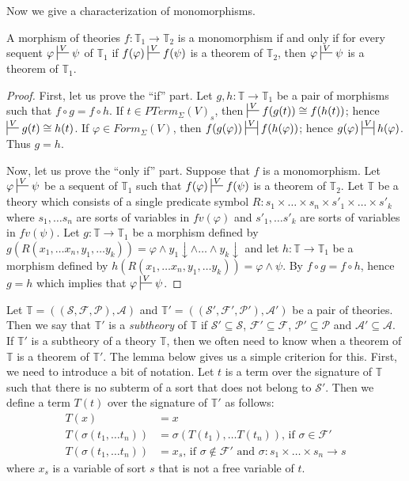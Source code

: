 \documentclass{amsart}
\theoremstyle{definition}
\theoremstyle{remark}
\numberwithin{figure}{section}
\begin{document}
Now we give a characterization of monomorphisms.

\begin{prop}
A morphism of theories $f : \mathbb{T}_1 \to \mathbb{T}_2$ is a monomorphism if and only if for every sequent $\varphi \sststile{}{V} \psi$ of $\mathbb{T}_1$
if $f(\varphi) \sststile{}{V} f(\psi)$ is a theorem of $\mathbb{T}_2$, then $\varphi \sststile{}{V} \psi$ is a theorem of $\mathbb{T}_1$.
\end{prop}
\begin{proof}
First, let us prove the ``if'' part.
Let $g,h : \mathbb{T} \to \mathbb{T}_1$ be a pair of morphisms such that $f \circ g = f \circ h$.
If $t \in PTerm_\Sigma(V)_s$, then $\sststile{}{V} f(g(t)) \cong f(h(t))$; hence $\sststile{}{V} g(t) \cong h(t)$.
If $\varphi \in Form_\Sigma(V)$, then $f(g(\varphi)) \ssststile{}{V} f(h(\varphi))$; hence $g(\varphi) \ssststile{}{V} h(\varphi)$.
Thus $g = h$.

Now, let us prove the ``only if'' part.
Suppose that $f$ is a monomorphism.
Let $\varphi \sststile{}{V} \psi$ be a sequent of $\mathbb{T}_1$ such that $f(\varphi) \sststile{}{V} f(\psi)$ is a theorem of $\mathbb{T}_2$.
Let $\mathbb{T}$ be a theory which consists of a single predicate symbol $R : s_1 \times \ldots \times s_n \times s'_1 \times \ldots \times s'_k$
where $s_1, \ldots s_n$ are sorts of variables in $fv(\varphi)$ and $s'_1, \ldots s'_k$ are sorts of variables in $fv(\psi)$.
Let $g : \mathbb{T} \to \mathbb{T}_1$ be a morphism defined by $g(R(x_1, \ldots x_n, y_1, \ldots y_k)) = \varphi \land y_1\!\downarrow \land \ldots \land y_k\!\downarrow$ and
let $h : \mathbb{T} \to \mathbb{T}_1$ be a morphism defined by $h(R(x_1, \ldots x_n, y_1, \ldots y_k)) = \varphi \land \psi$.
By  $f \circ g = f \circ h$, hence $g = h$ which implies that $\varphi \sststile{}{V} \psi$.
\end{proof}

Let $\mathbb{T} = ((\mathcal{S},\mathcal{F},\mathcal{P}),\mathcal{A})$ and $\mathbb{T}' = ((\mathcal{S}',\mathcal{F}',\mathcal{P}'),\mathcal{A}')$ be a pair of theories.
Then we say that $\mathbb{T}'$ is a \emph{subtheory} of $\mathbb{T}$ if $\mathcal{S}' \subseteq \mathcal{S}$, $\mathcal{F}' \subseteq \mathcal{F}$, $\mathcal{P}' \subseteq \mathcal{P}$ and $\mathcal{A}' \subseteq \mathcal{A}$.
If $\mathbb{T}'$ is a subtheory of a theory $\mathbb{T}$, then we often need to know when a theorem of $\mathbb{T}$ is a theorem of $\mathbb{T}'$.
The lemma below gives us a simple criterion for this.
First, we need to introduce a bit of notation.
Let $t$ is a term over the signature of $\mathbb{T}$ such that there is no subterm of a sort that does not belong to $\mathcal{S}'$.
Then we define a term $T(t)$ over the signature of $\mathbb{T}'$ as follows:
\begin{align*}
T(x) & = x \\
T(\sigma(t_1, \ldots t_n)) & = \sigma(T(t_1), \ldots T(t_n)) \text{, if $\sigma \in \mathcal{F}'$} \\
T(\sigma(t_1, \ldots t_n)) & = x_s \text{, if $\sigma \notin \mathcal{F}'$ and $\sigma : s_1 \times \ldots \times s_n \to s$}
\end{align*}
where $x_s$ is a variable of sort $s$ that is not a free variable of $t$.
\end{document}
